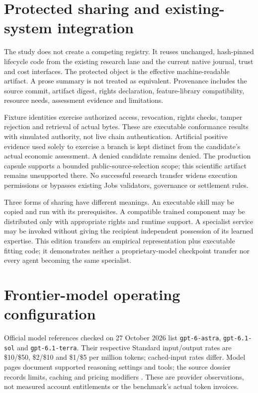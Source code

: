 \documentclass[11pt,letterpaper]{article}
\newcommand{\money}[1]{\$#1}
\begin{document}


\section{Protected sharing and existing-system integration}

The study does not create a competing registry. It reuses unchanged, hash-pinned lifecycle code from the existing research lane and the current native journal, trust and cost interfaces. The protected object is the effective machine-readable artifact. A prose summary is not treated as equivalent. Provenance includes the source commit, artifact digest, rights declaration, feature-library compatibility, resource needs, assessment evidence and limitations.



Fixture identities exercise authorized access, revocation, rights checks, tamper rejection and retrieval of actual bytes. These are executable conformance results with simulated authority, not live chain authentication. Artificial positive evidence used solely to exercise a branch is kept distinct from the candidate's actual economic assessment. A denied candidate remains denied. The production capsule supports a bounded public-source-selection scope; this scientific artifact remains unsupported there. No successful research transfer widens execution permissions or bypasses existing Jobs validators, governance or settlement rules.

Three forms of sharing have different meanings. An executable skill may be copied and run with its prerequisites. A compatible trained component may be distributed only with appropriate rights and runtime support. A specialist service may be invoked without giving the recipient independent possession of its learned expertise. This edition transfers an empirical representation plus executable fitting code; it demonstrates neither a proprietary-model checkpoint transfer nor every agent becoming the same specialist.

\section{Frontier-model operating configuration}

Official model references checked on 27 October 2026 list \texttt{gpt-6-astra}, \texttt{gpt-6.1-sol} and \texttt{gpt-6.1-terra}. Their respective Standard input/output rates are \money{10}/\money{50}, \money{2}/\money{10} and \money{1}/\money{5} per million tokens; cached-input rates differ. Model pages document supported reasoning settings and tools; the source dossier records limits, caching and pricing modifiers \cite{astra,sol,terra,pricing}. These are provider observations, not measured account entitlements or the benchmark's actual token invoices.
\end{document}
